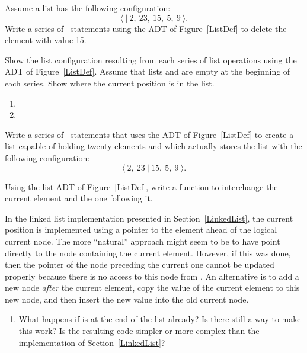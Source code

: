 \begin{exercises}

\item
Assume a list has the following configuration:
\[\langle\ |\ 2,\ 23,\ 15,\ 5,\ 9\ \rangle.\]
Write a series of \Lang\ statements using the 
ADT
of Figure~\ref{ListDef} to delete the element with value 15.

\item
Show the list configuration resulting from each series of list
operations using the  ADT of
Figure~\ref{ListDef}.
Assume that lists  and  are empty at the beginning
of each series.
Show where the current position is in the list.

\begin{enumerate}
\item {}

\item {}

\end{enumerate}

\item
Write a series of \Lang\ statements that uses the  ADT of
Figure~\ref{ListDef} to create a
list capable of holding twenty elements and which actually stores the
list with the following configuration:
\[\langle\ 2,\ 23\ |\ 15,\ 5,\ 9\ \rangle.\]

\item
Using the list ADT of Figure~\ref{ListDef}, write a function to
interchange the current element and the one following it.

\item
\label{FenceExer}
In the linked list implementation presented in
Section~\ref{LinkedList}, the current position is implemented using a
pointer to the element ahead of the logical current node.
The more ``natural'' approach might seem to be to have 
point directly to the node containing the current element.
However, if this was done, then the pointer of the node preceding the
current one cannot be updated properly because there is
no access to this node from .
An alternative is to add a new node \emph{after} the current element,
copy the value of the current element to this new node,
and then insert the new value into the old current node.

\begin{enumerate}
\item
What happens if  is at the end of the list already?
Is there still a way to make this work?
Is the resulting code simpler or more complex than the implementation
of Section~\ref{LinkedList}?


\end{enumerate}
\end{exercises}

